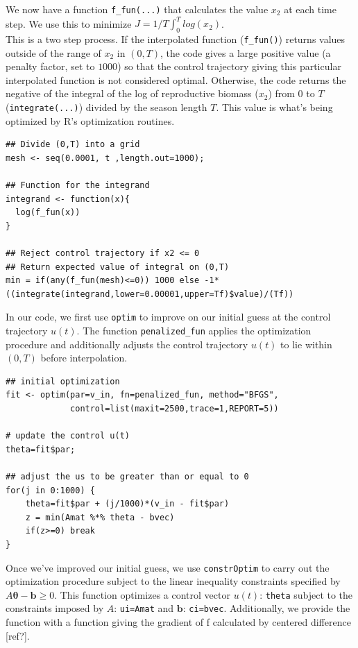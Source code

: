 \documentclass[12pt, oneside]{article}   	%
\begin{document}
\noindent We now have a function \lstinline{f_fun(...)} that calculates the value $x_2$ at each time step. We use this to minimize $ J = 1/T \int_{0}^{T} log(x_2)$. \\

\noindent This is a two step process. If the interpolated function (\lstinline{f_fun()}) returns values outside of the range of $x_2$ in $(0,T)$, the code gives a large positive value (a penalty factor, set to $1000$) so that the control trajectory giving this particular interpolated function is not considered optimal. Otherwise, the code returns the negative of the integral of the log of reproductive biomass ($x_2$) from $0$ to $T$ (\lstinline{integrate(...)}) divided by the season length $T$. This value is what's being optimized by R's optimization routines. 

\begin{lstlisting}
## Divide (0,T) into a grid
mesh <- seq(0.0001, t ,length.out=1000);

## Function for the integrand
integrand <- function(x){
  log(f_fun(x))
}
  
## Reject control trajectory if x2 <= 0
## Return expected value of integral on (0,T) 
min = if(any(f_fun(mesh)<=0)) 1000 else -1*((integrate(integrand,lower=0.00001,upper=Tf)$value)/(Tf))
\end{lstlisting}

\noindent In our code, we first use \lstinline{optim} to improve on our initial guess at the control trajectory $u(t)$. The function \lstinline{penalized_fun} applies the optimization procedure and additionally adjusts the control trajectory $u(t)$ to lie within $(0,T)$ before interpolation. 

\begin{lstlisting}
## initial optimization
fit <- optim(par=v_in, fn=penalized_fun, method="BFGS",
             control=list(maxit=2500,trace=1,REPORT=5))

# update the control u(t)
theta=fit$par; 

## adjust the us to be greater than or equal to 0
for(j in 0:1000) {  
    theta=fit$par + (j/1000)*(v_in - fit$par) 
    z = min(Amat %*% theta - bvec)
    if(z>=0) break
}    
\end{lstlisting}

\noindent Once we've improved our initial guess, we use \lstinline{constrOptim} to carry out the optimization procedure subject to the linear inequality constraints specified by $ A \bm{\theta} - \bm{b} \geq 0 $. This function optimizes a control vector $u(t)$: \lstinline{theta} subject to the constraints imposed by $A$: \lstinline{ui=Amat} and $\bm{b}$: \lstinline{ci=bvec}. Additionally, we provide the function with a function giving the gradient of f calculated by centered difference [ref?].
\end{document}
